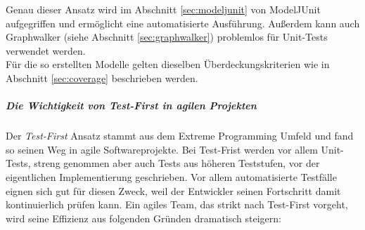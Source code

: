 Genau dieser Ansatz wird im Abschnitt \ref{sec:modeljunit} von ModelJUnit aufgegriffen und ermöglicht eine automatisierte Ausführung. Außerdem kann auch Graphwalker (siehe Abschnitt \ref{sec:graphwalker}) problemlos für Unit-Tests verwendet werden.\\
Für die so erstellten Modelle gelten dieselben Überdeckungskriterien wie in Abschnitt \ref{sec:coverage} beschrieben werden.

\subparagraph{Die Wichtigkeit von Test-First in agilen Projekten}  

Der \textit{Test-First} Ansatz stammt aus dem Extreme Programming Umfeld\cite{beck_extreme_2000} und fand so seinen Weg in agile Softwareprojekte. Bei Test-Frist werden vor allem Unit-Tests, streng genommen aber auch Tests aus höheren Teststufen, vor der eigentlichen Implementierung geschrieben. Vor allem automatisierte Testfälle eignen sich gut für diesen Zweck, weil der Entwickler seinen Fortschritt damit kontinuierlich prüfen kann. Ein agiles Team, das strikt nach Test-First vorgeht, wird seine Effizienz aus folgenden Gründen dramatisch steigern\cite{linz_testing_2014}:

